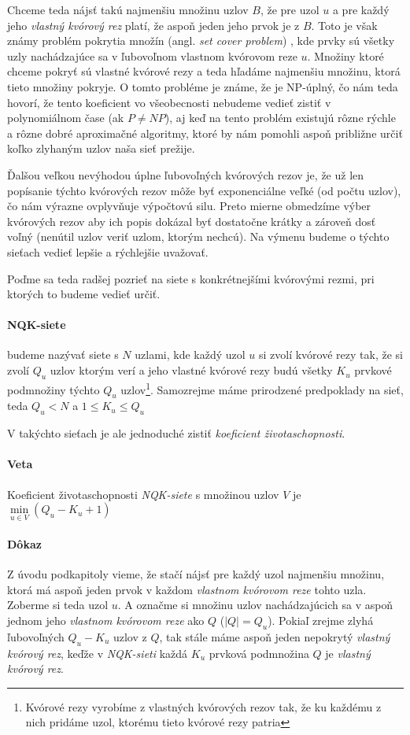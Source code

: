 Chceme teda nájsť takú najmenšiu množinu uzlov $B$, že pre uzol $u$ a pre každý
jeho \textit{vlastný kvórový rez} platí, že aspoň jeden jeho prvok je z $B$.
Toto je však známy problém pokrytia množín (angl. \textit{set cover problem})
\cite{karp1972reducibilitysetcover},
kde prvky sú všetky uzly nachádzajúce sa v ľubovoľnom vlastnom kvórovom reze $u$.
Množiny ktoré chceme pokryť sú vlastné kvórové rezy
a teda hľadáme najmenšiu množinu, ktorá tieto množiny pokryje.
O tomto probléme je známe, že je NP-úplný, čo nám teda hovorí, že tento koeficient
vo všeobecnosti nebudeme vedieť zistiť v polynomiálnom čase (ak $P\neq NP$), aj keď
na tento problém existujú rôzne rýchle a rôzne dobré aproximačné algoritmy,
ktoré by nám pomohli aspoň približne určiť koľko zlyhaným uzlov naša sieť prežije.

Ďalšou veľkou nevýhodou úplne ľubovoľných kvórových rezov je,
že už len popísanie týchto kvórových rezov môže byť exponenciálne veľké (od počtu uzlov),
čo nám výrazne ovplyvňuje výpočtovú silu. Preto mierne obmedzíme výber kvórových rezov
aby ich popis dokázal byť dostatočne krátky a zároveň dosť voľný (nenútil uzlov veriť
uzlom, ktorým nechcú). Na výmenu budeme o týchto sieťach vedieť lepšie a rýchlejšie
uvažovať.

Poďme sa teda radšej pozrieť na siete s konkrétnejšími kvórovými rezmi, pri ktorých
to budeme vedieť určiť.

\paragraph{NQK-siete} budeme nazývať siete s $N$ uzlami, kde každý uzol $u$ si
zvolí kvórové rezy tak, že si zvolí $Q_u$ uzlov ktorým verí a jeho vlastné kvórové rezy
budú všetky $K_u$ prvkové podmnožiny týchto $Q_u$ uzlov\footnote{Kvórové rezy
vyrobíme z vlastných kvórových rezov tak, že ku každému z nich pridáme uzol, ktorému
tieto kvórové rezy patria}.
Samozrejme máme prirodzené predpoklady na sieť, teda $Q_u < N$ a $1\leq K_u\leq Q_u$

\vspace{4mm}
V takýchto sieťach je ale jednoduché zistiť \textit{koeficient životaschopnosti}.

\paragraph{Veta}
Koeficient životaschopnosti \textit{NQK-siete} s množinou uzlov $V$ je
$\min\limits_{u\in V}(Q_u-K_u+1)$

\paragraph{Dôkaz}Z úvodu podkapitoly vieme, že stačí nájsť pre každý uzol
najmenšiu množinu, ktorá má aspoň jeden prvok v každom
\textit{vlastnom kvórovom reze} tohto uzla.
Zoberme si teda uzol $u$. A označme si množinu uzlov nachádzajúcich sa v aspoň
jednom jeho \textit{vlastnom kvórovom reze} ako $Q$ ($|Q|=Q_u$).
Pokiaľ zrejme zlyhá ľubovoľných $Q_u-K_u$ uzlov z $Q$, tak stále máme aspoň
jeden nepokrytý \textit{vlastný kvórový rez}, keďže v \textit{NQK-sieti}
každá $K_u$ prvková podmnožina $Q$ je \textit{vlastný kvórový rez}.

